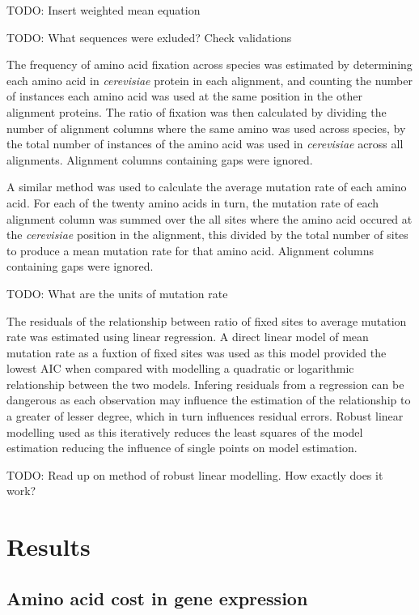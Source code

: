 TODO: Insert weighted mean equation

TODO: What sequences were exluded? Check validations

The frequency of amino acid fixation across species was estimated by determining each amino acid in \emph{cerevisiae} protein in each alignment, and counting the number of instances each amino acid was used at the same position in the other alignment proteins. The ratio of fixation was then calculated by dividing the number of alignment columns where the same amino was used across species, by the total number of instances of the amino acid was used in \emph{cerevisiae} across all alignments. Alignment columns containing gaps were ignored.

A similar method was used to calculate the average mutation rate of each amino acid. For each of the twenty amino acids in turn, the mutation rate of each alignment column was summed over the all sites where the amino acid occured at the \emph{cerevisiae} position in the alignment, this divided by the total number of sites to produce a mean mutation rate for that amino acid. Alignment columns containing gaps were ignored.

TODO: What are the units of mutation rate

The residuals of the relationship between ratio of fixed sites to average mutation rate was estimated using linear regression. A direct linear model of mean mutation rate as a fuxtion of fixed sites was used as this model provided the lowest AIC when compared with modelling a quadratic or logarithmic relationship between the two models. Infering residuals from a regression can be dangerous as each observation may influence the estimation of the relationship to a greater of lesser degree, which in turn influences residual errors. Robust linear modelling used as this iteratively reduces the least squares of the model estimation reducing the influence of single points on model estimation.

TODO: Read up on method of robust linear modelling. How exactly does it work?

\clearpage

\section{Results}

\subsection{Amino acid cost in gene expression}

